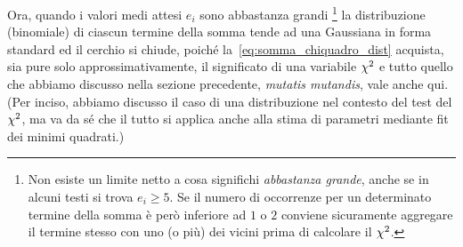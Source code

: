 Ora, quando i valori medi attesi $e_i$ sono abbastanza grandi%
\footnote{Non esiste un limite netto a cosa significhi \emph{abbastanza grande},
  anche se in alcuni testi si trova $e_i \geq 5$. Se il numero di occorrenze
  per un determinato termine della somma è però inferiore ad $1$ o $2$
  conviene sicuramente aggregare il termine stesso con uno (o più) dei vicini
  prima di calcolare il $\chi^2$.}
la distribuzione (binomiale) di ciascun termine della somma tende ad una
Gaussiana in forma standard ed il cerchio si chiude, poiché
la~\eqref{eq:somma_chiquadro_dist} acquista, sia pure solo approssimativamente,
il significato di una variabile $\chi^2$ e tutto quello che abbiamo discusso
nella sezione precedente, \emph{mutatis mutandis}, vale anche qui. (Per inciso,
abbiamo discusso il caso di una distribuzione nel contesto del test del
$\chi^2$, ma va da sé che il tutto si applica anche alla stima di parametri
mediante fit dei minimi quadrati.)

